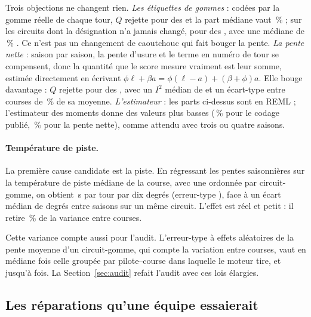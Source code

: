 \documentclass[11pt,a4paper]{article}
\begin{document}
Trois objections ne changent rien. \emph{Les étiquettes de gommes} : codées par
la gomme réelle de chaque tour, $Q$ rejette pour \TauRealHet{} des \TauRealN{}
et la part médiane vaut \TauRealShareReml{}\,\% \TauRealShareRemlCi{} ; sur les
\TauUnchangedCircuits{} circuits dont la désignation n'a jamais changé, pour
\TauUnchangedHet{} des \TauUnchangedN{}, avec une médiane de
\TauUnchangedShareReml{}\,\% \TauUnchangedShareRemlCi{}. Ce n'est pas un
changement de caoutchouc qui fait bouger la pente. \emph{La pente nette} :
saison par saison, la pente d'usure et le terme en numéro de tour se
compensent, donc la quantité que le score mesure vraiment est leur somme,
estimée directement en écrivant $\phi\ell + \beta a = \phi(\ell - a) +
(\beta + \phi)a$. Elle bouge davantage : $Q$ rejette pour \TauNetHet{} des
\TauNetN{}, avec un $I^2$ médian de \TauNetIsq{} et un écart-type entre courses
de \TauNetShareReml{}\,\% \TauNetShareRemlCi{} de sa moyenne.
\emph{L'estimateur} : les parts ci-dessus sont en REML ; l'estimateur des moments
donne des valeurs plus basses (\TauPubShareDl{}\,\% pour le codage publié,
\TauNetShareDl{}\,\% pour la pente nette), comme attendu avec trois ou quatre
saisons.

\paragraph{Température de piste.} La première cause candidate est la piste. En
régressant les pentes saisonnières sur la température de piste médiane de la
course, avec une ordonnée par circuit-gomme, on obtient \TempTheta{}\,s par tour
par dix degrés (erreur-type \TempThetaSe{}), face à un écart médian de
\TempRange{} degrés entre saisons sur un même circuit. L'effet est réel et
petit : il retire \TempShare{}\,\% de la variance entre courses.

Cette variance compte aussi pour l'audit. L'erreur-type à effets aléatoires de la
pente moyenne d'un circuit-gomme, qui compte la variation entre courses, vaut en
médiane \VarSeInflation{} fois celle groupée par pilote--course dans laquelle le
moteur tire, et jusqu'à \VarSeInflationMax{} fois. La Section~\ref{sec:audit}
refait l'audit avec ces lois élargies.

\subsection{Les réparations qu'une équipe essaierait}
\label{sec:repairs}
\end{document}
